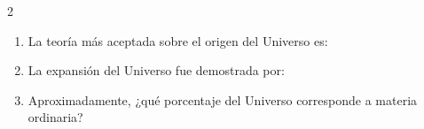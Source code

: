 \documentclass[10pt]{article}
\begin{document}
\begin{multicols}{2}
\begin{enumerate}[label=\textbf{\arabic*.}]
			\item La teoría más aceptada sobre el origen del Universo es:
			
			\vspace{0.3cm}
			
			\item La expansión del Universo fue demostrada por:
			
			\vspace{0.3cm}
			
			\item Aproximadamente, ¿qué porcentaje del Universo corresponde a materia ordinaria?
			
		\end{enumerate}
		
	\end{multicols}
	
\end{document}

